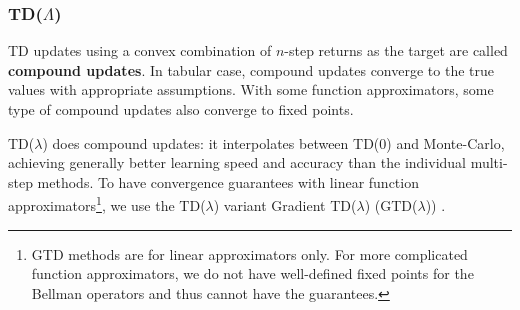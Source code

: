 \documentclass{article}
\begin{document}



\subsubsection{TD($\Lambda$)}
\begin{fact}
TD updates using a convex combination of $n$-step returns as the target are called \textbf{compound updates}. In tabular case, compound updates converge to the true values with appropriate assumptions. With some function approximators, some type of compound updates also converge to fixed points.
\end{fact}
TD($\lambda$) does compound updates: it interpolates between TD($0$) and Monte-Carlo, achieving generally better learning speed and accuracy than the individual multi-step methods. To have convergence guarantees with linear function approximators\footnote{GTD methods are for linear approximators only. For more complicated function approximators, we do not have well-defined fixed points for the Bellman operators and thus cannot have the guarantees.}, we use the TD($\lambda$) variant Gradient TD($\lambda$) (GTD($\lambda$)) \cite{sutton2009fast}.
\end{document}
